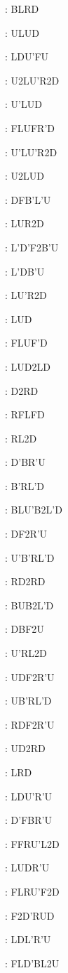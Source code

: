 \documentclass[9pt]{article}
\begin{document}
{\begin{multicols}{6}
: BLRD

: ULUD

: LDU'FU

: U2LU'R2D

: U'LUD

: FLUFR'D

: U'LU'R2D

: U2LUD

: DFB'L'U

: LUR2D

: L'D'F2B'U

: L'DB'U

: LU'R2D

: LUD

: FLUF'D

: LUD2LD

: D2RD

: RFLFD

: RL2D

: D'BR'U

: B'RL'D

: BLU'B2L'D

: DF2R'U

: U'B'RL'D

: RD2RD

: BUB2L'D

: DBF2U

: U'RL2D

: UDF2R'U

: UB'RL'D

: RDF2R'U

: UD2RD

: LRD

: LDU'R'U

: D'FBR'U

: FFRU'L2D

: LUDR'U

: FLRU'F2D

: F2D'RUD

: LDL'R'U

: FLD'BL2U


\end{multicols}}
\end{document}
